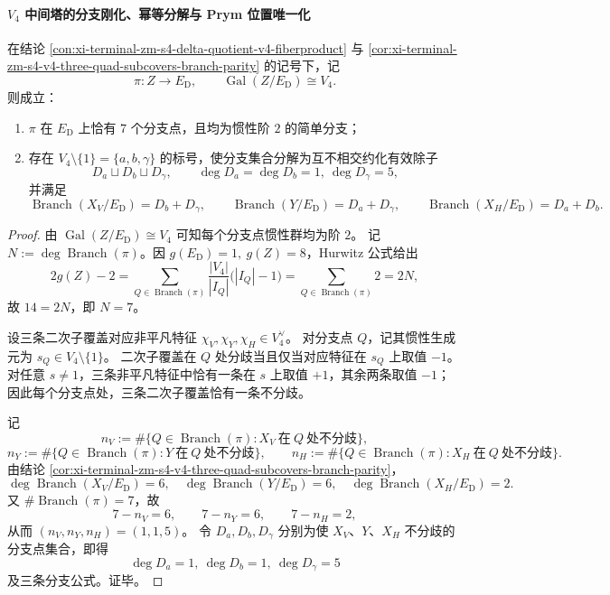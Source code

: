 \paragraph{\texorpdfstring{$V_4$}{V4} 中间塔的分支刚化、幂等分解与 Prym 位置唯一化}

\begin{conclusion}\label{con:xi-terminal-zm-s4-v4-ed-branchcount-inertia-115}
在结论 \ref{con:xi-terminal-zm-s4-delta-quotient-v4-fiberproduct} 与
\ref{cor:xi-terminal-zm-s4-v4-three-quad-subcovers-branch-parity} 的记号下，记
\[
\pi:Z\longrightarrow E_{\mathrm D},\qquad \operatorname{Gal}(Z/E_{\mathrm D})\cong V_4.
\]
则成立：
\begin{enumerate}
  \item \(\pi\) 在 \(E_{\mathrm D}\) 上恰有 \(7\) 个分支点，且均为惯性阶 \(2\) 的简单分支；
  \item 存在 \(V_4\setminus\{1\}=\{a,b,\gamma\}\) 的标号，使分支集合分解为互不相交约化有效除子
  \[
  D_a\sqcup D_b\sqcup D_\gamma,\qquad
  \deg D_a=\deg D_b=1,\ \deg D_\gamma=5,
  \]
  并满足
  \[
  \operatorname{Branch}(X_V/E_{\mathrm D})=D_b+D_\gamma,\qquad
  \operatorname{Branch}(Y/E_{\mathrm D})=D_a+D_\gamma,\qquad
  \operatorname{Branch}(X_H/E_{\mathrm D})=D_a+D_b.
  \]
\end{enumerate}
\end{conclusion}
\begin{proof}
由 \(\operatorname{Gal}(Z/E_{\mathrm D})\cong V_4\) 可知每个分支点惯性群均为阶 \(2\)。
记 \(N:=\deg\operatorname{Branch}(\pi)\)。因 \(g(E_{\mathrm D})=1,\ g(Z)=8\)，Hurwitz 公式给出
\[
2g(Z)-2
=\sum_{Q\in\operatorname{Branch}(\pi)}\frac{|V_4|}{|I_Q|}\bigl(|I_Q|-1\bigr)
=\sum_{Q\in\operatorname{Branch}(\pi)}2
=2N,
\]
故 \(14=2N\)，即 \(N=7\)。

设三条二次子覆盖对应非平凡特征
\(
\chi_V,\chi_Y,\chi_H\in V_4^\vee
\)。
对分支点 \(Q\)，记其惯性生成元为 \(s_Q\in V_4\setminus\{1\}\)。
二次子覆盖在 \(Q\) 处分歧当且仅当对应特征在 \(s_Q\) 上取值 \(-1\)。
对任意 \(s\neq 1\)，三条非平凡特征中恰有一条在 \(s\) 上取值 \(+1\)，其余两条取值 \(-1\)；
因此每个分支点处，三条二次子覆盖恰有一条不分歧。

记
\[
n_V:=\#\{Q\in\operatorname{Branch}(\pi):X_V\ \text{在}\ Q\ \text{处不分歧}\},
\]
\[
n_Y:=\#\{Q\in\operatorname{Branch}(\pi):Y\ \text{在}\ Q\ \text{处不分歧}\},\qquad
n_H:=\#\{Q\in\operatorname{Branch}(\pi):X_H\ \text{在}\ Q\ \text{处不分歧}\}.
\]
由结论 \ref{cor:xi-terminal-zm-s4-v4-three-quad-subcovers-branch-parity}，
\[
\deg\operatorname{Branch}(X_V/E_{\mathrm D})=6,\quad
\deg\operatorname{Branch}(Y/E_{\mathrm D})=6,\quad
\deg\operatorname{Branch}(X_H/E_{\mathrm D})=2.
\]
又 \(\#\operatorname{Branch}(\pi)=7\)，故
\[
7-n_V=6,\qquad 7-n_Y=6,\qquad 7-n_H=2,
\]
从而 \((n_V,n_Y,n_H)=(1,1,5)\)。
令 \(D_a,D_b,D_\gamma\) 分别为使 \(X_V\)、\(Y\)、\(X_H\) 不分歧的分支点集合，即得
\[
\deg D_a=1,\ \deg D_b=1,\ \deg D_\gamma=5
\]
及三条分支公式。证毕。
\end{proof}

